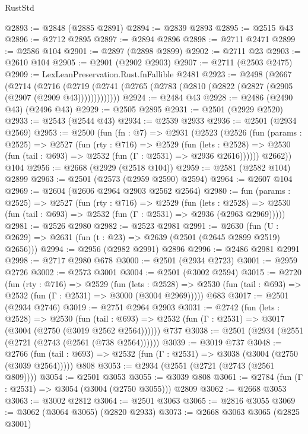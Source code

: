 \begin{lexlean}{RustStd}
\begin{coremodule}
{\begin{coremodule}
{{{{{{{{{{{{{{{{{{{{@2893 := @2848 (@2885 @2891)
@2894 := @2839 @2893
@2895 := @2515 @43
@2896 := @2712 @2895
@2897 := @2894 @2896
@2898 := @2711 @2471
@2899 := @2586 @104
@2901 := @2897 (@2898 @2899)
@2902 := @2711 @23
@2903 := @2610 @104
@2905 := @2901 (@2902 @2903)
@2907 := @2711 (@2503 @2475)
@2909 := LexLeanPreservation.Rust.fnFallible @2481
@2923 := @2498
    (@2667
      (@2714
        (@2716
          (@2719 (@2741 (@2765 (@2783 (@2810 (@2822 (@2827 (@2905 (@2907 (@2909 @43)))))))))))))
@2924 := @2484 @43
@2928 := @2486 (@2490 @43) (@2496 @43)
@2929 := @2505 @2895
@2931 := @2501 (@2929 @2520)
@2933 := @2543 (@2544 @43)
@2934 := @2539 @2933
@2936 := @2501 (@2934 @2569)
@2953 := @2500
    (fun (fn : @7) =>
    @2931
      (@2523
        (@2526
          (fun (params : @2525) =>
          @2527
            (fun (rty : @716) =>
            @2529
              (fun (lets : @2528) =>
              @2530 (fun (tail : @693) => @2532 (fun (Γ : @2531) => @2936 @2616))))))
        @2662))
    @104
@2956 := @2668 (@2929 (@2518 @104))
@2959 := @2581 (@2582 @104) @2899
@2963 := @2501 (@2573 (@2959 @2590) @2594)
@2964 := @2607 @104
@2969 := @2604 (@2606 @2964 @2903 @2562 @2564)
@2980 := fun (params : @2525) =>
  @2527
    (fun (rty : @716) =>
    @2529
      (fun (lets : @2528) =>
      @2530 (fun (tail : @693) => @2532 (fun (Γ : @2531) => @2936 (@2963 @2969)))))
@2981 := @2526 @2980
@2982 := @2523 @2981
@2991 := @2630 (fun (U : @2629) => @2631 (fun (t : @23) => @2639 (@2501 (@2645 @2899 @2519) @2656)))
@2994 := @2956 (@2982 @2991) @2896
@2996 := @2486 @2981 @2991
@2998 := @2717 @2980 @678
@3000 := @2501 (@2934 @2723)
@3001 := @2959 @2726
@3002 := @2573 @3001
@3004 := @2501 (@3002 @2594)
@3015 := @2720
    (fun (rty : @716) =>
    @2529
      (fun (lets : @2528) =>
      @2530 (fun (tail : @693) => @2532 (fun (Γ : @2531) => @3000 (@3004 @2969)))))
    @683
@3017 := @2501 (@2934 @2746)
@3019 := @2751 @2964 @2903
@3031 := @2742
    (fun (lets : @2528) =>
    @2530
      (fun (tail : @693) => @2532 (fun (Γ : @2531) => @3017 (@3004 (@2750 (@3019 @2562 @2564))))))
    @737
@3038 := @2501 (@2934 (@2551 (@2721 (@2743 (@2561 (@738 @2564))))))
@3039 := @3019 @737
@3048 := @2766
    (fun (tail : @693) => @2532 (fun (Γ : @2531) => @3038 (@3004 (@2750 (@3039 @2564)))))
    @808
@3053 := @2934 (@2551 (@2721 (@2743 (@2561 @809))))
@3054 := @2501 @3053
@3055 := @3039 @808
@3061 := @2784 (fun (Γ : @2531) => @3054 (@3004 (@2750 @3055))) @2809
@3062 := @2668 @3053
@3063 := @3002 @2812
@3064 := @2501 @3063
@3065 := @2816 @3055
@3069 := @3062 (@3064 @3065) (@2820 @2933)
@3073 := @2668 @3063 @3065 (@2825 @3001)
}}}}}}}}}}}}}}}}}}}}
\end{coremodule}}
\end{coremodule}
\end{lexlean}
